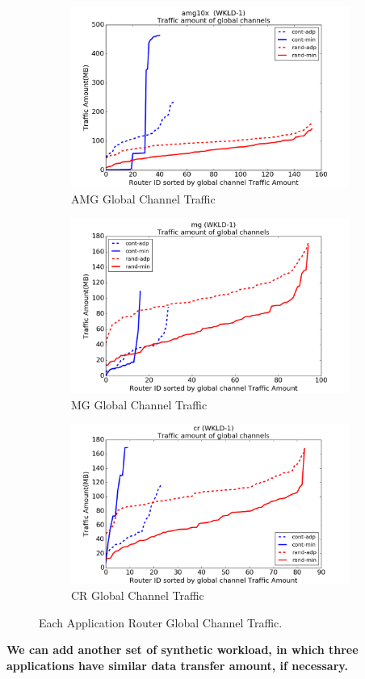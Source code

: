 \documentclass[conference,compsoc]{IEEEtran}
\begin{document}
\begin{figure}[t!]
    \centering
    \begin{subfigure}[t]{0.32\textwidth}
        \centering
        \includegraphics[height=1.5 in]{syn-wkld/amg10/gc-traffic}
        \caption{AMG Global Channel Traffic}
        \label{fig:samg-gc-traffic}
    \end{subfigure}%
    \hspace{1em}%
    \begin{subfigure}[t]{0.32\textwidth}
        \centering
        \includegraphics[height=1.5 in]{syn-wkld/mg/gc-traffic}
        \caption{MG Global Channel Traffic}
        \label{fig:syn-mg-gc-traffic}
    \end{subfigure}%
    \begin{subfigure}[t]{0.32\textwidth}
        \centering
        \includegraphics[height=1.5 in]{syn-wkld/cr/gc-traffic}
        \caption{CR Global Channel Traffic}
        \label{fig:syn-cr-gc-traffic}
    \end{subfigure}%
   \caption{Each Application Router Global Channel Traffic.}
   \label{fig:syn-3app-gc-traffic}
\end{figure}


\textbf{We can add another set of synthetic workload, in which three applications have similar data transfer amount, if necessary. }
\end{document}
